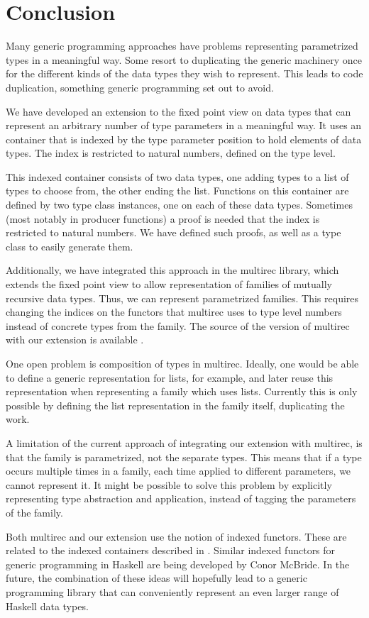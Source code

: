 \chapter{Conclusion}
\label{cha:conclusion}

Many generic programming approaches have problems representing
parametrized types in a meaningful way. Some resort to duplicating the
generic machinery once for the different kinds of the data types they
wish to represent. This leads to code duplication, something generic
programming set out to avoid.

We have developed an extension to the fixed point view on data types
that can represent an arbitrary number of type parameters in a
meaningful way. It uses an container that is indexed by the type
parameter position to hold elements of data types. The index is
restricted to natural numbers, defined on the type level.

This indexed container consists of two data types, one adding types to
a list of types to choose from, the other ending the list. Functions
on this container are defined by two type class instances, one on each
of these data types. Sometimes (most notably in producer functions) a
proof is needed that the index is restricted to natural numbers. We
have defined such proofs, as well as a type class to easily generate
them.

Additionally, we have integrated this approach in the multirec
library, which extends the fixed point view to allow representation of
families of mutually recursive data types. Thus, we can represent
parametrized families. This requires changing the indices on the
functors that multirec uses to type level numbers instead of concrete
types from the family. The source of the version of multirec with our
extension is available \cite{mysvn}.

One open problem is composition of types in multirec. Ideally, one
would be able to define a generic representation for lists, for
example, and later reuse this representation when representing a
family which uses lists. Currently this is only possible by defining
the list representation in the family itself, duplicating the work.

A limitation of the current approach of integrating our extension with
multirec, is that the family is parametrized, not the separate types.
This means that if a type occurs multiple times in a family, each time
applied to different parameters, we cannot represent it. It might be
possible to solve this problem by explicitly representing type
abstraction and application, instead of tagging the parameters of
the family.

Both multirec and our extension use the notion of indexed functors.
These are related to the indexed containers described in
\cite{indexedcontainers}.  Similar indexed functors for generic
programming in Haskell are being developed by Conor McBride. In the
future, the combination of these ideas will hopefully lead to a
generic programming library that can conveniently represent an even
larger range of Haskell data types.

